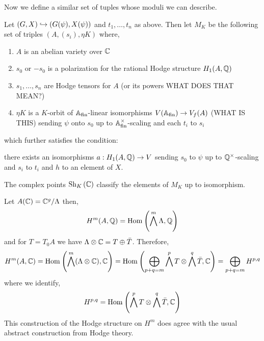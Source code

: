\documentclass[12pt]{article}
\begin{document}
\begin{rmk}
Now we define a similar set of tuples whose moduli we can describe.
\end{rmk}

\begin{defn}
Let $(G, X) \hookrightarrow (G(\psi), X(\psi))$ and $t_1, \dots, t_n$ as above. Then let $M_K$ be the following set of triples $(A, (s_i), \eta K)$ where,
\begin{enumerate}
\item $A$ is an abelian variety over $\mathbb{C}$
\item $s_0$ or $-s_0$ is a polarization for the rational Hodge structure $H_1(A, \mathbb{Q})$
\item $s_1, \dots, s_n$ are Hodge tensors for $A$ (or its powers WHAT DOES THAT MEAN?)
\item $\eta K$ is a $K$-orbit of $\mathbb{A}_{\mathrm{fin}}$-linear isomorphisms $V(\mathbb{A}_{\mathrm{fin}}) \to V_f(A)$ (WHAT IS THIS) sending $\psi$ onto $s_0$ up to $\mathbb{A}_{\mathrm{fin}}^\times$-scaling and each $t_i$ to $s_i$
\end{enumerate}
which further satisfies the condition:
\begin{center}
there exists an isomorphisms $a : H_1(A, \mathbb{Q}) \to V$ sending $s_0$ to $\psi$ up to $\mathbb{Q}^\times$-scaling and $s_i$ to $t_i$ and $h$ to an element of $X$.
\end{center}
\end{defn}

\begin{theorem}
The complex points $\mathrm{Sh}_{K} \left( \mathbb{C} \right)$ classify the elements of $M_K$ up to isomorphism. 
\end{theorem}

\begin{rmk}
Let $A(\mathbb{C}) = \mathbb{C}^g / \Lambda$ then,
\[ H^m(A, \mathbb{Q}) = \mathrm{Hom}_{} \left( \bigwedge^m \Lambda, \mathbb{Q} \right) \]
and for $T = T_0 A$ we have $\Lambda \otimes \mathbb{C} = T \oplus \bar{T}$. Therefore,
\[ H^m(A, \mathbb{C}) = \mathrm{Hom}_{} \left( \bigwedge^m (\Lambda \otimes \mathbb{C}), \mathbb{C} \right) = \mathrm{Hom}_{} \left( \bigoplus_{p + q = m} \bigwedge^p T \otimes \bigwedge^q \bar{T}, \mathbb{C} \right) = \bigoplus_{p + q = m} H^{p, q} \]
where we identify,
\[ H^{p,q} = \mathrm{Hom}_{} \left( \bigwedge^p T \otimes \bigwedge^q \bar{T}, \mathbb{C} \right) \]
This construction of the Hodge structure on $H^m$ does agree with the usual abstract construction from Hodge theory. 
\end{rmk}
\end{document}
